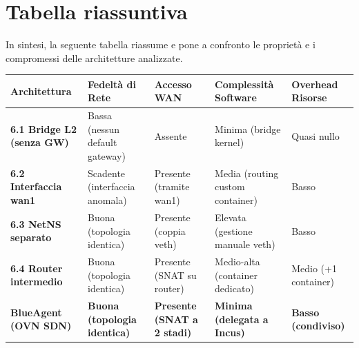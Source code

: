 \newpage

\section{Tabella riassuntiva}\label{tabella-riassuntiva}

In sintesi, la seguente tabella riassume e pone a confronto le proprietà
e i compromessi delle architetture analizzate.

\begin{longtable}[]{@{}
  >{\raggedright\arraybackslash}p{}
  >{\raggedright\arraybackslash}p{}
  >{\raggedright\arraybackslash}p{}
  >{\raggedright\arraybackslash}p{}
  >{\raggedright\arraybackslash}p{}@{}}
\toprule\noalign{}
\begin{minipage}[b]{\linewidth}\raggedright
Architettura
\end{minipage} & \begin{minipage}[b]{\linewidth}\raggedright
Fedeltà di Rete
\end{minipage} & \begin{minipage}[b]{\linewidth}\raggedright
Accesso WAN
\end{minipage} & \begin{minipage}[b]{\linewidth}\raggedright
Complessità Software
\end{minipage} & \begin{minipage}[b]{\linewidth}\raggedright
Overhead Risorse
\end{minipage} \\
\midrule\noalign{}
\endhead
\bottomrule\noalign{}
\endlastfoot
\textbf{6.1 Bridge L2 (senza GW)} & Bassa (nessun default gateway) &
Assente & Minima (bridge kernel) & Quasi nullo \\
\textbf{6.2 Interfaccia wan1} & Scadente (interfaccia anomala) &
Presente (tramite wan1) & Media (routing custom container) & Basso \\
\textbf{6.3 NetNS separato} & Buona (topologia identica) & Presente
(coppia veth) & Elevata (gestione manuale veth) & Basso \\
\textbf{6.4 Router intermedio} & Buona (topologia identica) & Presente
(SNAT su router) & Medio-alta (container dedicato) & Medio (+1
container) \\
\textbf{BlueAgent (OVN SDN)} & \textbf{Buona (topologia identica)} &
\textbf{Presente (SNAT a 2 stadi)} & \textbf{Minima (delegata a Incus)}
& \textbf{Basso (condiviso)} \\
\end{longtable}
